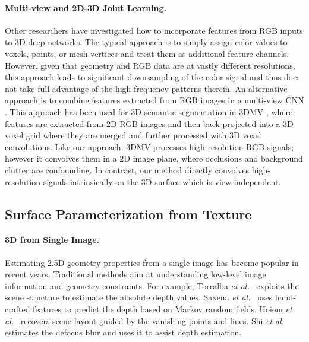 \paragraph*{Multi-view and 2D-3D Joint Learning.}
Other researchers have investigated how to incorporate features from RGB inputs to 3D deep networks.  The typical approach is to simply assign color values to voxels, points, or mesh vertices and treat them as additional feature channels.
However, given that geometry and RGB data are at vastly different resolutions, this approach leads to significant downsampling of the color signal and thus does not take full advantage of the high-frequency patterns therein.   An alternative approach is to combine features extracted from RGB images in a multi-view CNN \cite{su2015multi}. This approach has been used for 3D semantic segmentation in 3DMV \cite{dai20183dmv}, where features are extracted from 2D RGB images and then back-projected into a 3D voxel grid where they are merged and further processed with 3D voxel convolutions.  Like our approach, 3DMV processes high-resolution RGB signals; however it convolves them in a 2D image plane, where occlusions and background clutter are confounding.  In contrast, our method directly convolves high-resolution signals intrinsically on the 3D surface which is view-independent.

\subsection{Surface Parameterization from Texture}
\label{related:framenet}
\paragraph*{3D from Single Image.}
Estimating 2.5D geometry properties from a single image has become popular in recent years. Traditional methods aim at understanding low-level image information and geometry constraints. For example, Torralba \textit{et al.}~\cite{torralba2002depth} exploits the scene structure to estimate the absolute depth values. Saxena \textit{et al.}~\cite{saxena2006learning} uses hand-crafted features to predict the depth based on Markov random fields. Hoiem \textit{et al.}~\cite{hoiem2007recovering} recovers scene layout guided by the vanishing points and lines. Shi \textit{et al.}~\cite{shi2015break} estimates the defocus blur and uses it to assist depth estimation.

